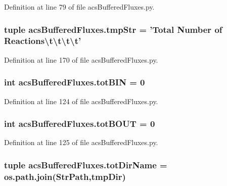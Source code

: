 Definition at line 79 of file acs\-Buffered\-Fluxes.\-py.

\hypertarget{a00092_a5b34c38ff1251831412c297823a2a945}{
\subsubsection[{tmp\-Str}]{\setlength{\rightskip}{0pt plus 5cm}tuple acs\-Buffered\-Fluxes.\-tmp\-Str = 'Total Number of Reactions\textbackslash{}t\textbackslash{}t\textbackslash{}t\textbackslash{}t'}}\label{a00092_a5b34c38ff1251831412c297823a2a945}


Definition at line 170 of file acs\-Buffered\-Fluxes.\-py.

\hypertarget{a00092_ae057f24c5c495bb01544251db7e74ad9}{
\subsubsection[{tot\-B\-I\-N}]{\setlength{\rightskip}{0pt plus 5cm}int acs\-Buffered\-Fluxes.\-tot\-B\-I\-N = 0}}\label{a00092_ae057f24c5c495bb01544251db7e74ad9}


Definition at line 124 of file acs\-Buffered\-Fluxes.\-py.

\hypertarget{a00092_a3da6f0cfe81256d19a801c63ccbe0c96}{
\subsubsection[{tot\-B\-O\-U\-T}]{\setlength{\rightskip}{0pt plus 5cm}int acs\-Buffered\-Fluxes.\-tot\-B\-O\-U\-T = 0}}\label{a00092_a3da6f0cfe81256d19a801c63ccbe0c96}


Definition at line 125 of file acs\-Buffered\-Fluxes.\-py.

\hypertarget{a00092_a7883e37b9556e49968e7a7dd08893bfb}{
\subsubsection[{tot\-Dir\-Name}]{\setlength{\rightskip}{0pt plus 5cm}tuple acs\-Buffered\-Fluxes.\-tot\-Dir\-Name = os.\-path.\-join(Str\-Path,tmp\-Dir)}}\label{a00092_a7883e37b9556e49968e7a7dd08893bfb}


